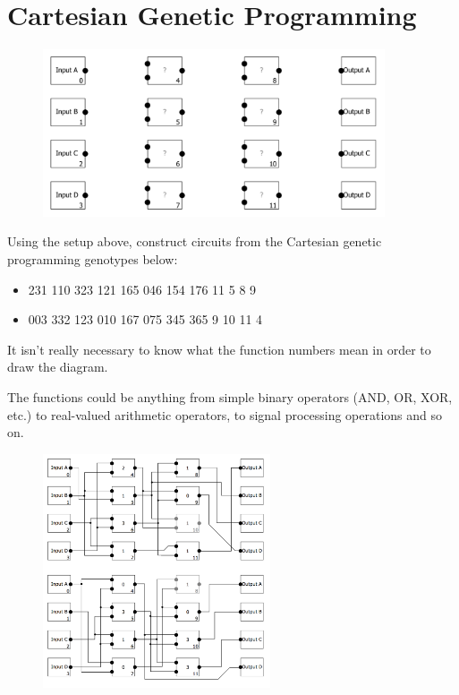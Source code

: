 \section{Cartesian Genetic Programming}
\begin{figure}[H]
\begin{center}
\includegraphics[width=0.9\textwidth]{cartesian.png}
\end{center}
\end{figure}
Using the setup above, construct circuits from the Cartesian genetic programming genotypes below:
\begin{itemize}
    \item 231 110 323 121 165 046 154 176 11 5 8 9
    \item 003 332 123 010 167 075 345 365 9 10 11 4
\end{itemize}

It isn't really necessary to know what the function numbers mean in order to draw the diagram.

The functions could be anything from simple binary operators (AND, OR, XOR, etc.) to real-valued arithmetic operators, to signal processing operations and so on.

\begin{figure}[H]
\begin{center}
\includegraphics[width=0.6\textwidth]{cgp_sol.png}
\end{center}
\end{figure}



